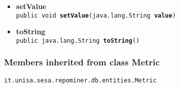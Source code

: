 {{{\begin{itemize}
{\texttt{public void\ {\bf  setMetricId}(\texttt{java.lang.Integer} {\bf  metricId})
\label{it.unisa.sesa.repominer.db.entities.MetricMethod.setMetricId(java.lang.Integer)}}%
}%
\item{ 
\hypertarget{it.unisa.sesa.repominer.db.entities.MetricMethod.setValue(java.lang.String)}{{\bf  setValue}\\}
\texttt{public void\ {\bf  setValue}(\texttt{java.lang.String} {\bf  value})
\label{it.unisa.sesa.repominer.db.entities.MetricMethod.setValue(java.lang.String)}}%
}%
\item{ 
\hypertarget{it.unisa.sesa.repominer.db.entities.MetricMethod.toString()}{{\bf  toString}\\}
\texttt{public java.lang.String\ {\bf  toString}()
\label{it.unisa.sesa.repominer.db.entities.MetricMethod.toString()}}%
}%
\end{itemize}
}
\subsubsection{Members inherited from class Metric }{
\texttt{it.unisa.sesa.repominer.db.entities.Metric} {\small 
{}}
{\small 

}}}}
